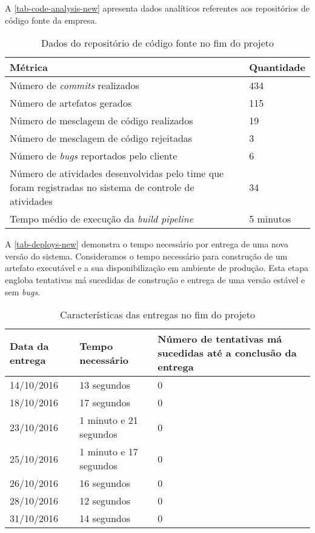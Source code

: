 \documentclass[
	12pt,				%
	openright,			%
	oneside,			%
	a4paper,			%
	english,			%
	french,				%
	spanish,			%
	brazil,				%
	]{abntex2}
\begin{document}
A \autoref{tab-code-analysis-new} apresenta dados analíticos referentes aos repositórios de código fonte da empresa.

\begin{table}[htb]
	\caption{Dados do repositório de código fonte no fim do projeto}
	
	\label{tab-code-analysis-new}	
	\begin{tabular}{p{7.15cm}|p{7.10cm}}
		\textbf{Métrica} & \textbf{Quantidade}  \\
		\hline
		Número de \textit{commits} realizados & 434 \\
		\hline
		Número de artefatos gerados & 115 \\
		\hline
		Número de mesclagem de código realizados & 19 \\
		\hline
		Número de mesclagem de código rejeitadas & 3 \\
		\hline
		Número de \textit{bugs} reportados pelo cliente & 6 \\
		\hline
		Número de atividades desenvolvidas pelo time que foram registradas no sistema de controle de atividades & 34 \\
		\hline
		Tempo médio de execução da \textit{build pipeline} & 5 minutos \\
	\end{tabular}
\end{table}


A \autoref{tab-deploys-new} demonstra o tempo necessário por entrega de uma nova versão do sistema. Consideramos o tempo necessário para construção de um artefato executável e a sua disponibilização em ambiente de produção. Esta etapa engloba tentativas má sucedidas de construção e entrega de uma versão estável e sem \textit{bugs}.

\begin{table}[htb]
	\caption{Características das entregas no fim do projeto}
	
	\label{tab-deploys-new}	
	\begin{tabular}{p{3.85cm}|p{5.20cm}|p{5.20cm}}
		\textbf{Data da entrega} & \textbf{Tempo necessário} & \textbf{Número de tentativas má sucedidas até a conclusão da entrega}  \\
		\hline
		14/10/2016 & 13 segundos & 0 \\
		\hline
		18/10/2016 & 17 segundos & 0 \\
		\hline
		23/10/2016 & 1 minuto e 21 segundos & 0 \\
		\hline
		25/10/2016 & 1 minuto e 17 segundos & 0 \\
		\hline
		26/10/2016 & 16 segundos & 0 \\
		\hline
		28/10/2016 & 12 segundos & 0 \\
		\hline
		31/10/2016 & 14 segundos & 0 \\
	\end{tabular}
\end{table}
\end{document}
